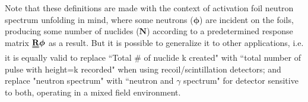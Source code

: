 \documentclass[a4paper, 12pt]{article}
\newcommand{\matr}[1]{\uuline{\bf{#1}}}
\newcommand{\ve}[1]{\boldsymbol{#1}}
\begin{document}
    Note that these definitions are made with the context of activation foil neutron spectrum unfolding in mind, where some neutrons ($\ve{\phi}$) are incident on the foils, producing some number of nuclides ($\ve{N}$) according to a predetermined response matrix $\matr{R}\ve{\phi}$ as a result. But it is possible to generalize it to other applications, i.e. it is equally valid to replace ``Total \# of nuclide k created" with ``total number of pulse with height=k recorded" when using recoil/scintillation detectors; and replace "neutron spectrum" with ``neutron and $\gamma$ spectrum" for detector sensitive to both, operating in a mixed field environment.
\end{document}
